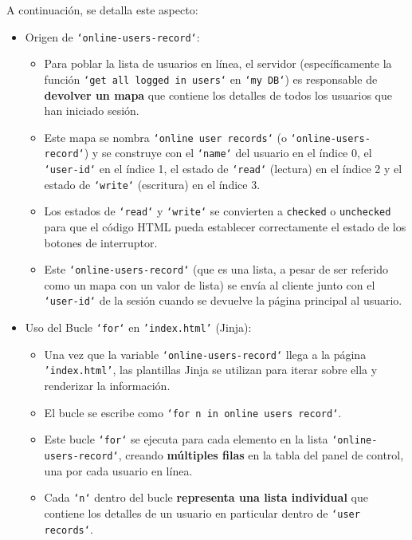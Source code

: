 \documentclass{report}
\begin{document}
A continuación, se detalla este aspecto:
\begin{itemize}
    \item Origen de \texttt{`online-users-record`}:
    \begin{itemize}
        \item Para poblar la lista de usuarios en línea, el servidor (específicamente la función \texttt{`get all logged in users`} en \texttt{`my DB`}) 
        es responsable de \textbf{devolver un mapa} que contiene los detalles de todos los usuarios que han iniciado sesión.
        \item Este mapa se nombra \texttt{`online user records`} (o \texttt{`online-users-record`}) y se construye con el \texttt{`name`} del
              usuario en el índice 0, el \texttt{`user-id`} en el índice 1, el estado de \texttt{`read`} (lectura) en el índice 2 y el estado de 
              \texttt{`write`} (escritura) en el índice 3.
        \item Los estados de \texttt{`read`} y \texttt{`write`} se convierten a \texttt{checked} o \texttt{unchecked} para que el código HTML pueda 
              establecer correctamente el estado de los botones de interruptor.
        \item Este \texttt{`online-users-record`} (que es una lista, a pesar de ser referido como un mapa con un valor de lista) se envía al cliente 
              junto con el \texttt{`user-id`} de la sesión cuando se devuelve la página principal al usuario.
    \end{itemize}

    \item Uso del Bucle \texttt{`for`} en \texttt{'index.html'} (Jinja):
    \begin{itemize}
        \item Una vez que la variable \texttt{`online-users-record`} llega a la página \texttt{'index.html'}, las plantillas Jinja se utilizan para 
        iterar sobre ella y renderizar la información.
        \item El bucle se escribe como \texttt{`for n in online users record`}.
        \item Este bucle \texttt{`for`} se ejecuta para cada elemento en la lista \texttt{`online-users-record`}, creando \textbf{múltiples filas} 
        en la tabla del panel de control, una por cada usuario en línea.
        \item Cada \texttt{`n`} dentro del bucle \textbf{representa una lista individual} que contiene los detalles de un usuario en particular dentro 
        de \texttt{`user records`}.    
    \end{itemize}


\end{itemize}
\end{document}
